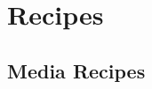 \chapter{Recipes}
\newpage
\setlength{\parindent}{0pt}
\setcounter{secnumdepth}{5}
\setcounter{section}{0}
\renewcommand*{\theHsection}{recp.\the\value{section}}

\section{Media Recipes}


